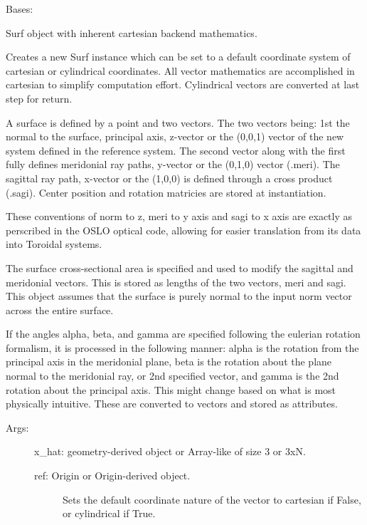 \documentclass[letterpaper,10pt,english]{sphinxmanual}
\begin{document}
\begin{fulllineitems}
\label{TRIPPy:TRIPPy.surface.Surf}
Bases: {\hyperref[TRIPPy:TRIPPy.geometry.Origin]{}}

Surf object with inherent cartesian backend mathematics.

Creates a new Surf instance which can be set to a default 
coordinate system of cartesian or cylindrical coordinates.
All vector mathematics are accomplished in cartesian to 
simplify computation effort. Cylindrical vectors are
converted at last step for return.

A surface is defined by a point and two vectors. The two 
vectors being: 1st the normal to the surface, principal axis,
z-vector or the (0,0,1) vector of the new system defined in
the reference system. The second vector along with the 
first fully defines meridonial ray paths, y-vector or the
(0,1,0) vector (.meri). The sagittal ray path, x-vector or
the (1,0,0) is defined through a cross product (.sagi).
Center position and rotation matricies are stored at
instantiation.

These conventions of norm to z, meri to y axis and sagi to
x axis are exactly as perscribed in the OSLO optical code,
allowing for easier translation from its data into Toroidal
systems.

The surface cross-sectional area is specified and used to modify
the sagittal and meridonial vectors. This is stored as lengths 
of the two vectors, meri and sagi. This object assumes that the 
surface is purely normal to the input norm vector across the
entire surface.

If the angles alpha, beta, and gamma are specified following
the eulerian rotation formalism, it is processed in the 
following manner: alpha is the rotation from the principal
axis in the meridonial plane, beta is the rotation about the
plane normal to the meridonial ray, or 2nd specified vector,
and gamma is the 2nd rotation about the principal axis. 
This might change based on what is most physically intuitive.
These are converted to vectors and stored as attributes.
\begin{description}
\item[{Args:}] \leavevmode
x\_hat: geometry-derived object or Array-like of size 3 or 3xN.
\begin{description}
\item[{ref: Origin or Origin-derived object.}] \leavevmode
Sets the default coordinate nature of the vector to 
cartesian if False, or cylindrical if True.


\end{description}
\end{description}
\end{fulllineitems}
\end{document}
